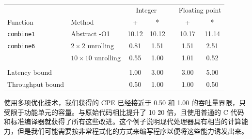 \begin{table}[!ht]
    \centering
    \begin{tabular}{llccccc}
        \toprule
        & & \multicolumn{2}{c}{Integer} & & \multicolumn{2}{c}{Floating point} \\
        \cmidrule{3-4} \cmidrule{6-7}
        Function & Method & + & * & & + & * \\
        \midrule
        \texttt{combine1} & Abstract -O1 & 10.12 & 10.12 & & 10.17 & 11.14 \\
        \texttt{combine6} & $2 \times 2$ unrolling & 0.81 & 1.51 & & 1.51 & 2.51 \\
                        & $10 \times 10$ unrolling & 0.55 & 1.00 & & 1.01 & 0.52 \\
        \\
        Latency bound & & 1.00 & 3.00 & & 3.00 & 5.00 \\
        Throughput bound & & 0.50 & 1.00 & & 1.00 & 0.50 \\
        \bottomrule
    \end{tabular}
\end{table}

使用多项优化技术，我们获得的 CPE 已经接近于 0.50 和 1.00 的吞吐量界限，只受限于功能单元的容量。与原始代码相比提升了 10 \~ 20 倍，且使用普通的 C 代码和标准编译器就获得了所有这些改进。这个例子说明现代处理器具有相当的计算能力，但是我们可能需要按非常程式化的方式来编写程序以便将这些能力诱发出来。
